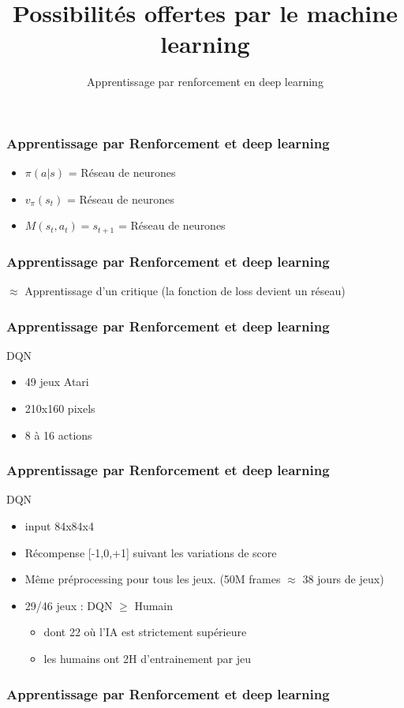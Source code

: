 \documentclass{formation}
\title{Possibilités offertes par le machine learning}
\subtitle{Apprentissage par renforcement en deep learning}
\begin{document}
\maketitle

\begin{frame}
  \frametitle{Apprentissage par Renforcement et deep learning}
  \begin{itemize}
  \item \textbf{$\pi(a | s)$} = Réseau de neurones
  \item \textbf{$v_{\pi}(s_t)$} = Réseau de neurones
  \item \textbf{$M(s_t,a_t)=s_{t+1}$} = Réseau de neurones
  \end{itemize}
\end{frame}

\begin{frame}
  \frametitle{Apprentissage par Renforcement et deep learning}
  $\approx$ Apprentissage d'un critique (la fonction de loss devient un réseau)
\end{frame}

\begin{frame}
  \frametitle{Apprentissage par Renforcement et deep learning}
  DQN
  \begin{itemize}
  \item 49 jeux Atari
  \item 210x160 pixels
  \item 8 à 16 actions
  \end{itemize}
\end{frame}

\begin{frame}
  \frametitle{Apprentissage par Renforcement et deep learning}
  DQN
  \begin{itemize}
  \item input 84x84x4
  \item Récompense [-1,0,+1] suivant les variations de score
  \item Même préprocessing pour tous les jeux. (50M frames $\approx$ 38 jours de jeux)
  \item 29/46 jeux : DQN $\geq$ Humain
    \begin{itemize}
    \item dont 22 où l'IA est strictement supérieure
    \item les humains ont 2H d'entrainement par jeu
    \end{itemize}
  \end{itemize}
\end{frame}

\begin{frame}
  \href{https://cs.stanford.edu/people/karpathy/reinforcejs/gridworld_td.html}{}
\end{frame}

\begin{frame}
  \frametitle{Apprentissage par Renforcement et deep learning}
  \href{https://www.youtube.com/watch?v=lcVg9hVya-c}{}
\end{frame}
\end{document}

